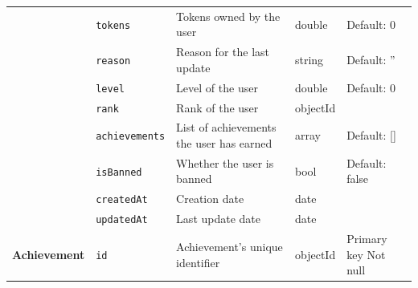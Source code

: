 \begin{landscape}
\begin{longtable}{ | m{} | m{} | m{} | m{} | m{} | }
        \cline{2-5}
                                                                         & \texttt{tokens}                           & Tokens owned by the user                                             & double        & Default: 0                    \\
        \cline{2-5}
                                                                         & \texttt{reason}                           & Reason for the last update                                           & string        & Default: ''                   \\
        \cline{2-5}
                                                                         & \texttt{level}                            & Level of the user                                                    & double        & Default: 0                    \\
        \cline{2-5}
                                                                         & \texttt{rank}                             & Rank of the user                                                     & objectId      &                               \\
        \cline{2-5}
                                                                         & \texttt{achievements}                     & List of achievements the user has earned                             & array         & Default: []                   \\
        \cline{2-5}
                                                                         & \texttt{isBanned}                         & Whether the user is banned                                           & bool          & Default: false                \\
        \cline{2-5}
                                                                         & \texttt{createdAt}                        & Creation date                                                        & date          &                               \\
        \cline{2-5}
                                                                         & \texttt{updatedAt}                        & Last update date                                                     & date          &                               \\
        \hline
        \multirow[t]{10}{5em}{\textbf{Achievement}}                      & \texttt{id}                               & Achievement's unique identifier                                      & objectId      & Primary key \newline Not null \\

\end{longtable}
\end{landscape}
